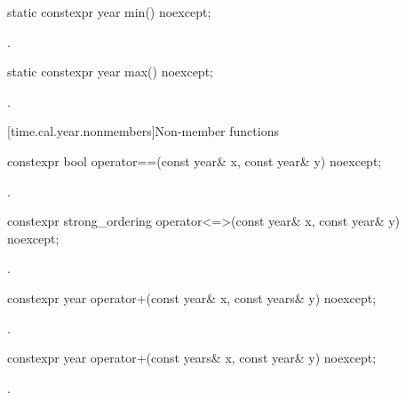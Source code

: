 %
\begin{itemdecl}
static constexpr year min() noexcept;
\end{itemdecl}

\begin{itemdescr}
\pnum
\returns
{}.
\end{itemdescr}

%
\begin{itemdecl}
static constexpr year max() noexcept;
\end{itemdecl}

\begin{itemdescr}
\pnum
\returns
{}.
\end{itemdescr}

[time.cal.year.nonmembers]{Non-member functions}

%
\begin{itemdecl}
constexpr bool operator==(const year& x, const year& y) noexcept;
\end{itemdecl}

\begin{itemdescr}
\pnum
\returns
{}.
\end{itemdescr}

%
\begin{itemdecl}
constexpr strong_ordering operator<=>(const year& x, const year& y) noexcept;
\end{itemdecl}

\begin{itemdescr}
\pnum
\returns
{}.
\end{itemdescr}

%
\begin{itemdecl}
constexpr year operator+(const year& x, const years& y) noexcept;
\end{itemdecl}

\begin{itemdescr}
\pnum
\returns
{}.
\end{itemdescr}

%
\begin{itemdecl}
constexpr year operator+(const years& x, const year& y) noexcept;
\end{itemdecl}

\begin{itemdescr}
\pnum
\returns
{}.
\end{itemdescr}

